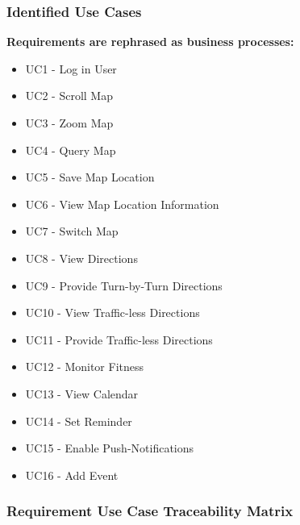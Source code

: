 \documentclass[runningheads,a4paper]{article}
\begin{document}
\subsubsection{Identified Use Cases}
\textbf{Requirements are rephrased as business processes:}
\begin{itemize}
	\item UC1 - Log in User
	\item UC2 - Scroll Map
	\item UC3 - Zoom Map
	\item UC4 - Query Map
	\item UC5 - Save Map Location
	\item UC6 - View Map Location Information
	\item UC7 - Switch Map
	\item UC8 - View Directions
	\item UC9 - Provide Turn-by-Turn Directions
	\item UC10 - View Traffic-less Directions
	\item UC11 - Provide Traffic-less Directions
	\item UC12 - Monitor Fitness
	\item UC13 - View Calendar
	\item UC14 - Set Reminder
	\item UC15 - Enable Push-Notifications
	\item UC16 - Add Event 
\end{itemize}

\pagebreak

\subsubsection{Requirement Use Case Traceability Matrix}
\end{document}
